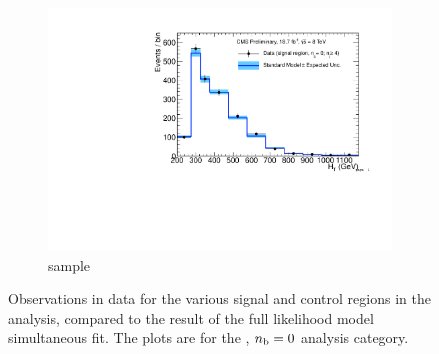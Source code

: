 \begin{figure}[h!]
\begin{subfigure}[b]{0.48\textwidth}
    \includegraphics[width=\textwidth,page=6]
    {Figs/results/v0/blueBand/bestFit_2012dev_RQcdZero_fZinvAll_0b_ge4j-12hp_smOnly}
    \caption{\gj sample}
  \end{subfigure}
  \caption{Observations in data for the various signal and control
  regions in the analysis, compared to the result of the full likelihood model
  simultaneous fit. The plots are for the \njhigh, $n_{\text{b}} = 0$ analysis category.}
  \label{fig:blue_fits_0b_ge4j}
\end{figure}

